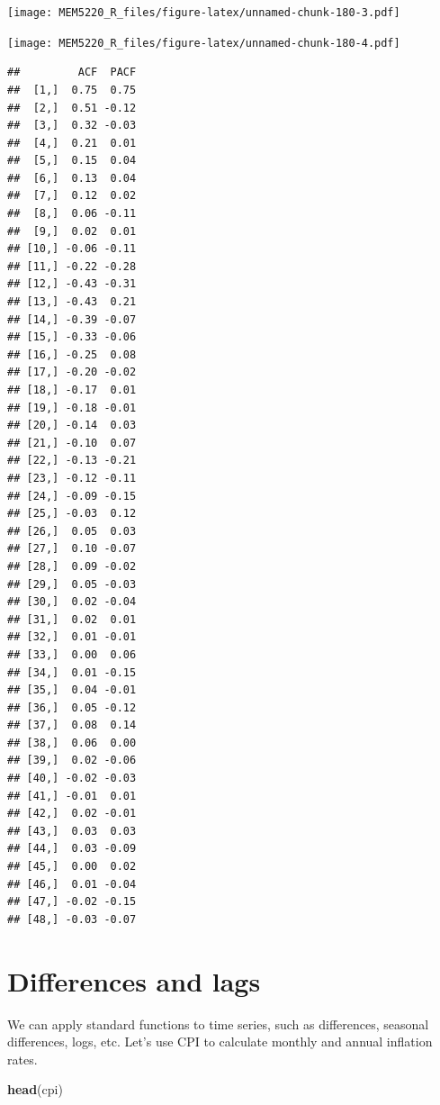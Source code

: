 \documentclass[]{book}
\newenvironment{Shaded}{\begin{snugshade}}{\end{snugshade}}
\newcommand{\CommentTok}[1]{\textcolor[rgb]{0.56,0.35,0.01}{\textit{#1}}}
\newcommand{\DecValTok}[1]{\textcolor[rgb]{0.00,0.00,0.81}{#1}}
\newcommand{\KeywordTok}[1]{\textcolor[rgb]{0.13,0.29,0.53}{\textbf{#1}}}
\newcommand{\NormalTok}[1]{#1}
\newcommand{\OperatorTok}[1]{\textcolor[rgb]{0.81,0.36,0.00}{\textbf{#1}}}
\begin{document}
\texttt{[image: MEM5220\_R\_files/figure-latex/unnamed-chunk-180-3.pdf]}

\begin{Shaded}
\end{Shaded}

\texttt{[image: MEM5220\_R\_files/figure-latex/unnamed-chunk-180-4.pdf]}

\begin{verbatim}
##         ACF  PACF
##  [1,]  0.75  0.75
##  [2,]  0.51 -0.12
##  [3,]  0.32 -0.03
##  [4,]  0.21  0.01
##  [5,]  0.15  0.04
##  [6,]  0.13  0.04
##  [7,]  0.12  0.02
##  [8,]  0.06 -0.11
##  [9,]  0.02  0.01
## [10,] -0.06 -0.11
## [11,] -0.22 -0.28
## [12,] -0.43 -0.31
## [13,] -0.43  0.21
## [14,] -0.39 -0.07
## [15,] -0.33 -0.06
## [16,] -0.25  0.08
## [17,] -0.20 -0.02
## [18,] -0.17  0.01
## [19,] -0.18 -0.01
## [20,] -0.14  0.03
## [21,] -0.10  0.07
## [22,] -0.13 -0.21
## [23,] -0.12 -0.11
## [24,] -0.09 -0.15
## [25,] -0.03  0.12
## [26,]  0.05  0.03
## [27,]  0.10 -0.07
## [28,]  0.09 -0.02
## [29,]  0.05 -0.03
## [30,]  0.02 -0.04
## [31,]  0.02  0.01
## [32,]  0.01 -0.01
## [33,]  0.00  0.06
## [34,]  0.01 -0.15
## [35,]  0.04 -0.01
## [36,]  0.05 -0.12
## [37,]  0.08  0.14
## [38,]  0.06  0.00
## [39,]  0.02 -0.06
## [40,] -0.02 -0.03
## [41,] -0.01  0.01
## [42,]  0.02 -0.01
## [43,]  0.03  0.03
## [44,]  0.03 -0.09
## [45,]  0.00  0.02
## [46,]  0.01 -0.04
## [47,] -0.02 -0.15
## [48,] -0.03 -0.07
\end{verbatim}

\hypertarget{differences-and-lags}{%
\section{Differences and lags}\label{differences-and-lags}}

We can apply standard functions to time series, such as differences, seasonal differences, logs, etc.
Let's use CPI to calculate monthly and annual inflation rates.

\begin{Shaded}
\begin{Highlighting}[]
\KeywordTok{head}\NormalTok{(cpi)}
\end{Highlighting}
\end{Shaded}
\end{document}
